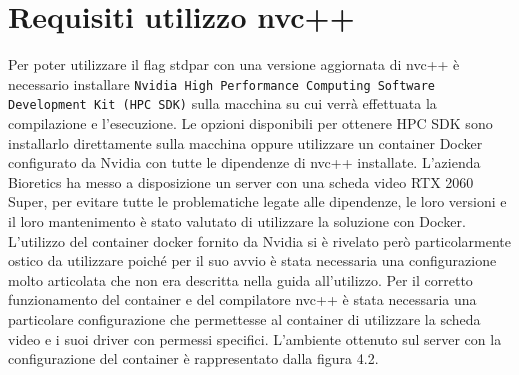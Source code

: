 \documentclass[12pt,a4paper]{report}
\begin{document}
\section{Requisiti utilizzo nvc++}
Per poter utilizzare il flag stdpar con una versione aggiornata di nvc++ è necessario installare \verb|Nvidia High Performance Computing Software Development Kit (HPC SDK)| sulla macchina su cui verrà effettuata la compilazione e l'esecuzione. Le opzioni disponibili per ottenere HPC SDK sono installarlo direttamente sulla macchina oppure utilizzare un container Docker configurato da Nvidia con tutte le dipendenze di nvc++ installate. \newline
L'azienda Bioretics ha messo a disposizione un server con una scheda video RTX 2060 Super, per evitare tutte le problematiche legate alle dipendenze, le loro versioni e il loro mantenimento è stato valutato di utilizzare la soluzione con Docker. \newline
L'utilizzo del container docker fornito da Nvidia si è rivelato però particolarmente ostico da utilizzare poiché per il suo avvio è stata necessaria una configurazione molto articolata che non era descritta nella guida all'utilizzo. Per il corretto funzionamento del container e del compilatore nvc++ è stata necessaria una particolare configurazione che permettesse al container di utilizzare la scheda video e i suoi driver con permessi specifici. 
L'ambiente ottenuto sul server con la configurazione del container è rappresentato dalla figura 4.2.

\begin{figure}[H]
\centering
\begin{floatrow}[1]
\end{floatrow}
\end{figure} \newpage
\end{document}
